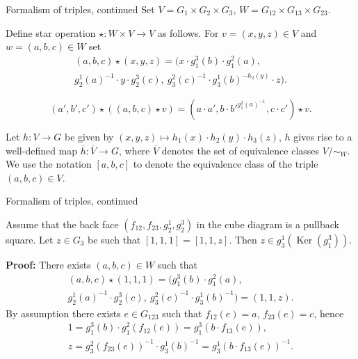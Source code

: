 \documentclass[handout]{beamer} %
\DeclareMathOperator{\Ker}{Ker}
\theoremstyle{definition}
\begin{document}
\begin{frame}{Formalism of triples, continued}
Set $V = G_1 \times G_2 \times G_3$, $W = G_{12} \times G_{13} \times G_{23}$.
\pause

Define star operation $\star \colon W \times V \to V$ as follows.
For $v = (x, y, z) \in V$ and $w = (a, b, c) \in W$ set
\begin{multline*} (a, b, c) \star (x, y, z) = (x \cdot g_1^3(b) \cdot g_1^2(a),\\ g_2^1(a)^{-1} \cdot y \cdot g_2^3(c),\ g_3^2(c)^{-1} \cdot g_3^1(b)^{-h_2(y)} \cdot z).\end{multline*}
\pause

\begin{equation*}(a', b', c') \star \left( (a, b, c) \star v \right) = (a \cdot a', b \cdot {b'}^{g_1^2(a)^{-1}}, c \cdot c') \star v.\end{equation*}
\pause

Let $h \colon V \to G$ be given by $(x, y, z) \mapsto h_1(x) \cdot h_2(y) \cdot h_3(z)$, $h$ gives rise to a well-defined map $\overline{h} \colon \overline{V} \to G$,
where $\overline{V}$ denotes the set of equivalence classes $V/\sim_W.$ We use the notation $[a, b, c]$ to denote the equivalence class of the triple $(a, b, c) \in V$.


\end{frame}

\begin{frame}{Formalism of triples, continued}
\begin{lemma} Assume that the back face $(f_{12}, f_{23}, g_2^1, g_2^3)$ in the cube diagram is a pullback square.
Let $z \in G_3$ be such that $[1, 1, 1] = [1, 1, z]$.
Then $z \in g_3^1(\Ker(g_1^3)).$ \end{lemma}
\pause
\textbf{Proof:} There exists $(a, b, c)\in W$ such that
\begin{multline*} (a, b, c) \star (1, 1, 1) = ( g_1^3(b) \cdot g_1^2(a),\\ g_2^1(a)^{-1} \cdot g_2^3(c),\ g_3^2(c)^{-1} \cdot g_3^1(b)^{-1}) = (1,1,z). \end{multline*}
\pause
By assumption there exists $e \in G_{123}$ such that $f_{12}(e) = a$, $f_{23}(e) = c$, hence
\begin{multline*} 1 = g_1^3(b) \cdot g_1^2(f_{12}(e)) = g_1^3(b \cdot f_{13}(e)),\\ z = g_3^2(f_{23}(e))^{-1} \cdot g_3^1(b)^{-1} = g_3^1(b \cdot f_{13}(e))^{-1}. \end{multline*}
\end{frame}
\end{document}
